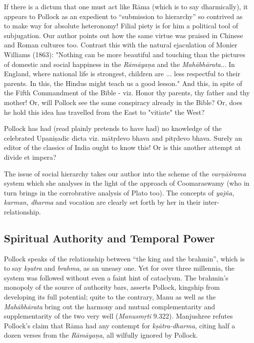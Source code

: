 If there is a dictum that one must act like Rāma (which is to say dharmically), it appears to Pollock as an expedient to “submission to hierarchy” so contrived as to make way for absolute heteronomy! Filial piety is for him a political tool of subjugation. Our author points out how the same virtue was praised in Chinese and Roman cultures too. Contrast this with the natural ejaculation of Monier Williams (1863): "Nothing can be more beautiful and touching than the pictures of domestic and social happiness in the {\sl Rāmāyaṇa} and the {\sl Mahābhārata}... In England, where national life is strongest, children are ... less respectful to their parents. In this, the Hindus might teach us a good lesson." And this, in spite of the Fifth Commandment of the Bible - viz. Honor thy parents, thy father and thy mother! Or, will Pollock see the same conspiracy already in the Bible? Or, does he hold this idea has travelled from the East to "vitiate" the West?

Pollock has had (read plainly pretends to have had) no knowledge of the celebrated Upaniṣadic dicta viz. mātṛdevo bhava and pitṛdevo bhava. Surely an editor of the classics of India ought to know this! Or is this another attempt at divide et impera?

The issue of social hierarchy takes our author into the scheme of the {\sl varṇāśrama} system which she analyses in the light of the approach of Coomaraswamy (who in turn brings in the corrobrative analysis of Plato too). The concepts of {\sl yajña, karman, dharma} and vocation are clearly set forth by her in their inter-relationship.\\[-20pt]

\subsection*{Spiritual Authority and Temporal Power}

Pollock speaks of the relationship between “the king and the brahmin”, which is to say {\sl kṣatra} and {\sl brahma}, as an uneasy one. Yet for over three millennia, the system was followed without even a faint hint of cataclysm. The brahmin's monopoly of the source of authority bars, asserts Pollock, kingship from developing its full potential; quite to the contrary, Manu as well as the {\sl Mahābhārata} bring out the harmony and mutual complementarity and supplementarity of the two very well ({\sl Manusmṛti} 9.322). Manjushree refutes Pollock's claim that Rāma had any contempt for {\sl kṣātra-dharma}, citing half a dozen verses from the {\sl Rāmāyaṇa}, all wilfully ignored by Pollock.

